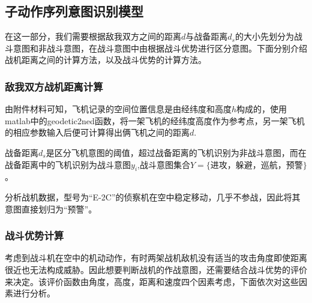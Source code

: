 \documentclass{my_paper}
\begin{document}
\subsection{子动作序列意图识别模型}
在这一部分，我们需要根据敌我双方之间的距离$d$与战备距离$d_s$的大小先划分为战斗意图和非战斗意图，在战斗意图中由根据战斗优势进行区分意图。下面分别介绍战机距离之间的计算方法，以及战斗优势的计算方法。

\subsubsection{敌我双方战机距离计算}

由附件材料可知，飞机记录的空间位置信息是由经纬度和高度$h$构成的，使用matlab中的geodetic2ned函数，将一架飞机的经纬度高度作为参考点，另一架飞机的相应参数输入后便可计算得出俩飞机之间的距离$d$.

战备距离$d_s$是区分飞机意图的阈值，超过战备距离的飞机识别为非战斗意图，而在战备距离中的飞机识别为战斗意图$y_i$,战斗意图集合$Y = \{$进攻，躲避，巡航，预警$\}$。

分析战机数据，型号为“E-2C”的侦察机在空中稳定移动，几乎不参战，因此将其意图直接划归为“预警”。

\subsubsection{战斗优势计算}

考虑到战斗机在空中的机动动作，有时两架战机敌机没有适当的攻击角度即使距离很近也无法构成威胁。因此想要判断战机的作战意图，还需要结合战斗优势的评价来决定。该评价函数由角度，高度，距离和速度四个因素考虑，下面依次对这些因素进行分析。
\end{document}
